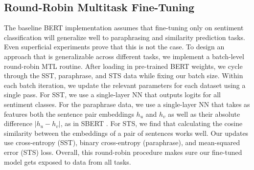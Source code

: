 \documentclass{article}
\begin{document}
\subsection{Round-Robin Multitask Fine-Tuning} 
The baseline BERT implementation assumes that fine-tuning only on sentiment classification will generalize well to paraphrasing and similarity prediction tasks. Even superficial experiments prove that this is not the case. To design an approach that is generalizable across different tasks, we implement a batch-level round-robin MTL routine. After loading in pre-trained BERT weights, we cycle through the SST, paraphrase, and STS data while fixing our batch size. Within each batch iteration, we update the relevant parameters for each dataset using a single pass. For SST, we use a single-layer NN that outputs logits for all sentiment classes. For the paraphrase data, we use a single-layer NN that takes as features both the sentence pair embeddings $h_u$ and $h_v$ as well as their absolute difference $|h_u - h_v|$, as in SBERT \cite{reimers2019sentence}. For STS, we find that calculating the cosine similarity between the embeddings of a pair of sentences works well. Our updates use cross-entropy (SST), binary cross-entropy (paraphrase), and mean-squared error (STS) loss. Overall, this round-robin procedure makes sure our fine-tuned model gets exposed to data from all tasks.
\end{document}
